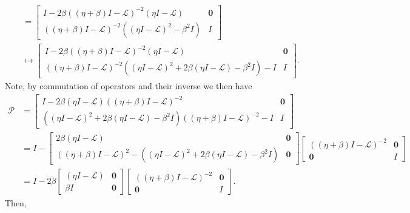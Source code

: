 \documentclass[a4paper,10pt]{article}
\begin{document}
\begin{align*}
& = \begin{bmatrix} I -
		2\beta((\eta+\beta)I - \mathcal{L})^{-2}(\eta I - \mathcal{L}) & \mathbf{0} \\
	((\eta+\beta)I - \mathcal{L})^{-2}( (\eta I - \mathcal{L})^2 - \beta^2I) & I \end{bmatrix} \\
& \mapsto \begin{bmatrix} I -
		2\beta((\eta+\beta)I - \mathcal{L})^{-2}(\eta I - \mathcal{L}) & \mathbf{0} \\
	((\eta+\beta)I - \mathcal{L})^{-2}( (\eta I - \mathcal{L})^2 + 2\beta(\eta I - \mathcal{L}) - \beta^2I) - I& I \end{bmatrix}.
\end{align*}
%
Note, by commutation of operators and their inverse we then have
%
\begin{align*}
\mathcal{P} & =  \begin{bmatrix} I -
		2\beta(\eta I - \mathcal{L})((\eta+\beta)I - \mathcal{L})^{-2} & \mathbf{0} \\
	( (\eta I - \mathcal{L})^2 + 2\beta(\eta I - \mathcal{L}) - \beta^2I)
		((\eta+\beta)I - \mathcal{L})^{-2} - I& I \end{bmatrix} \\
& = I - \begin{bmatrix} 2\beta(\eta I - \mathcal{L}) & \mathbf{0} \\ 
		((\eta+\beta)I - \mathcal{L})^{2} - ( (\eta I - \mathcal{L})^2 +
			2\beta(\eta I - \mathcal{L}) - \beta^2I) & \mathbf{0} \end{bmatrix}
		\begin{bmatrix} ((\eta+\beta)I - \mathcal{L})^{-2} & \mathbf{0} \\
		\mathbf{0} & I \end{bmatrix} \\
& = I - 2\beta\begin{bmatrix} (\eta I - \mathcal{L}) & \mathbf{0} \\ 
		\beta I & \mathbf{0} \end{bmatrix}
	\begin{bmatrix} ((\eta+\beta)I - \mathcal{L})^{-2} & \mathbf{0} \\
		\mathbf{0} & I \end{bmatrix}.
\end{align*}
%
Then, 
%
\end{document}

